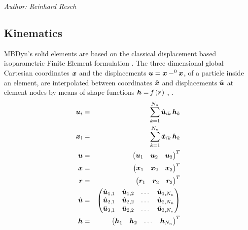 %
%
%
%
%
%
%
%
\emph{Author: Reinhard Resch}
\subsection{Kinematics}
MBDyn's solid elements are based on the classical displacement based isoparametric Finite Element formulation \cite{BATHE2016}.
The three dimensional global Cartesian coordinates $\bm{x}$ and the displacements $\bm{u}=\bm{x} - ^0\bm{x}$, of a particle inside an element,
are interpolated between coordinates $\hat{\bm{x}}$ and displacements $\hat{\bm{u}}$ at element nodes by means of shape functions $\bm{h}=\mathit{f}\left(\bm{r}\right)$ \cite{BATHE2016}, \cite{KUEBLER2005}.
\begin{eqnarray}
  \bm{u}_{i} &=& \sum_{k=1}^{N_n}\hat{\bm{u}}_{ik} \,\bm{h}_{k} \\
  \bm{x}_{i} &=& \sum_{k=1}^{N_n}\hat{\bm{x}}_{ik} \,\bm{h}_{k} \\
  \bm{u} &=& \begin{pmatrix} \bm{u}_1 & \bm{u}_2 & \bm{u}_3 \end{pmatrix}^T \\
  \bm{x} &=& \begin{pmatrix} \bm{x}_1 & \bm{x}_2 & \bm{x}_3 \end{pmatrix}^T \\
  \bm{r} &=& \begin{pmatrix} \bm{r}_1 & \bm{r}_2 & \bm{r}_3 \end{pmatrix}^T \\
  \hat{\bm{u}} &=& \begin{pmatrix}
    \hat{\bm{u}}_{1,1} & \hat{\bm{u}}_{1,2} & \ldots{} & \hat{\bm{u}}_{1,N_n} \\
    \hat{\bm{u}}_{2,1} & \hat{\bm{u}}_{2,2} & \ldots{} & \hat{\bm{u}}_{2,N_n} \\
    \hat{\bm{u}}_{3,1} & \hat{\bm{u}}_{2,2} & \ldots{} & \hat{\bm{u}}_{3,N_n}
  \end{pmatrix} \\
  \bm{h} & = & \begin{pmatrix}
    \bm{h}_1 & \bm{h}_2 & \ldots{} & \bm{h}_{N_n}
  \end{pmatrix}^T
\end{eqnarray}


